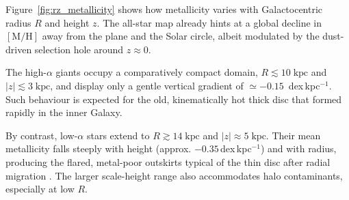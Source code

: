 \documentclass[a4paper,12pt]{article}
\begin{document}
Figure~\ref{fig:rz_metallicity} shows how metallicity varies with Galactocentric radius \(R\) and height \(z\).
The all-star map already hints at a global decline in \( [\mathrm{M/H}] \) away from the plane and the Solar circle, 
albeit modulated by the dust-driven selection hole around \(z\!\approx\!0\).

The high-$\alpha$ giants occupy a comparatively compact domain, \(R\!\lesssim\!10\;\mathrm{kpc}\) 
and \(|z|\!\lesssim\!3\;\mathrm{kpc}\), and display only a gentle vertical gradient of $\simeq-0.15$\,
dex\,kpc\(^{-1}\). Such behaviour is expected for the old, kinematically hot thick disc that formed 
rapidly in the inner Galaxy.

By contrast, low-$\alpha$ stars extend to \(R\!\gtrsim\!14\;\mathrm{kpc}\) and 
\(|z|\!\approx\!5\;\mathrm{kpc}\). Their mean metallicity falls steeply with height 
(approx. $-0.35$\,dex\,kpc\(^{-1}\)) and with radius, producing the flared, metal-poor outskirts 
typical of the thin disc after radial migration \citep{Haywood2013}.  
The larger scale-height range also accommodates halo contaminants, especially at low \(R\).
\end{document}
